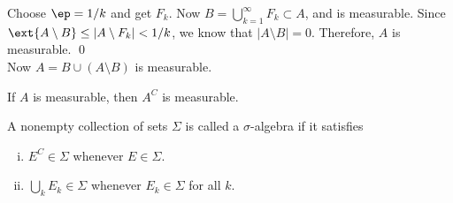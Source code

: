 \pf Choose $\ep=1/k$ and get $F_k$. Now $B= \bigcup_{k=1}^\infty F_k \subset A$, and is measurable. Since $\ext{A \setminus B} \leq |A \setminus F_k|< 1/k$, we know that $|A \setminus B|=0$. Therefore, $A$ is measurable. \qed \\




Now $A= B \cup (A \setminus B)$ is measurable. 



\begin{cor}
If $A$ is measurable, then $A^C$ is measurable.
\end{cor}












\begin{dfn}
A nonempty collection of sets $\Sigma$ is called a $\sigma$-algebra if it satisfies
	\begin{enumerate}[(i)]
	\item $E^C \in \Sigma$ whenever $E \in \Sigma$.
	\item $\bigcup_k E_k \in \Sigma$ whenever $E_k \in \Sigma$ for all $k$. 
	\end{enumerate}
\end{dfn}











